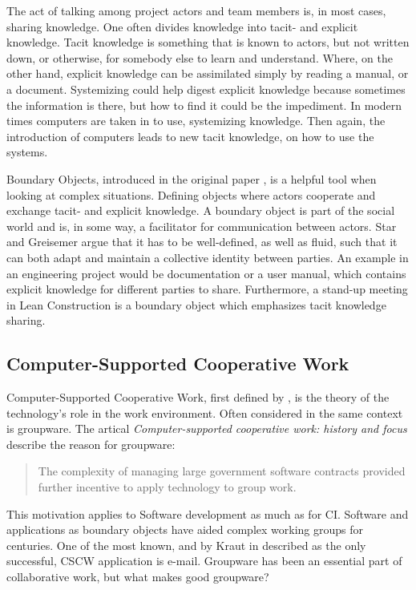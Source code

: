 The act of talking among project actors and team members is, in most cases, sharing knowledge. One often divides knowledge into tacit- and explicit knowledge. Tacit knowledge is something that is known to actors, but not written down, or otherwise, for somebody else to learn and understand. Where, on the other hand, explicit knowledge can be assimilated simply by reading a manual, or a document. Systemizing could help digest explicit knowledge because sometimes the information is there, but how to find it could be the impediment. In modern times computers are taken in to use, systemizing knowledge. Then again, the introduction of computers leads to new tacit knowledge, on how to use the systems.

Boundary Objects, introduced in the original paper \cite{star&griesemer}, is a helpful tool when looking at complex situations. Defining objects where actors cooperate and exchange tacit- and explicit knowledge. A boundary object is part of the social world and is, in some way, a facilitator for communication between actors. Star and Greisemer argue that it has to be well-defined, as well as fluid, such that it can both adapt and maintain a collective identity between parties. An example in an engineering project would be documentation or a user manual, which contains explicit knowledge for different parties to share. Furthermore, a stand-up meeting in Lean Construction is a boundary object which emphasizes tacit knowledge sharing.

\subsection{Computer-Supported Cooperative Work}
Computer-Supported Cooperative Work, first defined by \cite{Friedman}, is the theory of the technology's role in the work environment. Often considered in the same context is groupware. The artical \textit{Computer-supported cooperative work: history and focus} \cite{Grudin} describe the reason for groupware: 
\begin{quotation}
    The complexity of managing large government software contracts provided further incentive to apply technology to group work.
\end{quotation}
This motivation applies to Software development as much as for CI. Software and applications as boundary objects have aided complex working groups for centuries. One of the most known, and by Kraut in \cite{Kraut} described as the only successful, CSCW application is e-mail. Groupware has been an essential part of collaborative work, but what makes good groupware? 


